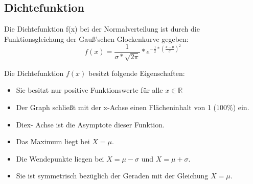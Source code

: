 \subsection{Dichtefunktion}

Die Dichtefunktion f(x) bei der Normalverteilung ist durch die Funktionsgleichung der Gauß'schen Glockenkurve gegeben:
$$f(x) = \frac{1}{\sigma*\sqrt{2\pi}}*e^{-\frac{1}{2}*(\frac{x-\mu}{\sigma})^2}$$

\hfill \break
Die Dichtefunktion $f(x)$ besitzt folgende Eigenschaften:
\begin{itemize}
    \item Sie besitzt nur positive Funktionswerte für alle $x \in \mathbb{R}$
    \item Der Graph schließt mit der x-Achse einen Flächeninhalt von 1 ($100\%$) ein.
    \item Diex- Achse ist die Asymptote dieser Funktion.
    \item Das Maximum liegt bei $X=\mu$.
    \item Die Wendepunkte liegen bei $X=\mu -\sigma$ und $X=\mu +\sigma$.
    \item Sie ist symmetrisch bezüglich der Geraden mit der Gleichung $X=\mu$.
\end{itemize}